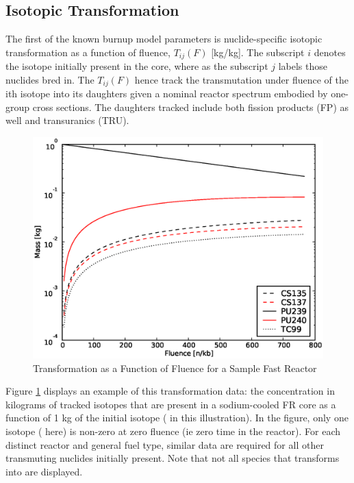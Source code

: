 \subsection{Isotopic Transformation}
\label{1g_sec:iso_transform}
The first of the known burnup model parameters is nuclide-specific isotopic transformation as a 
function of fluence, $T_{ij}(F)$ [kg/kg].  The subscript $i$ denotes 
the isotope initially present in the core, where as the subscript $j$ labels those nuclides bred in.  
The $T_{ij}(F)$ hence track the transmutation under fluence of the ith isotope into its daughters 
given a nominal reactor spectrum embodied by one-group cross sections.  The daughters tracked 
include both fission products (FP) as well and transuranics (TRU).
\begin{figure}[htbp]
\caption{ Transformation as a Function of Fluence for a Sample Fast Reactor}
\label{1g_fig01}
\begin{center}
\includegraphics[scale=0.5]{one_group_method/figs/Fig01.eps}
\end{center}
\end{figure}
Figure \ref{1g_fig01} displays an example of this transformation data: the concentration in 
kilograms of tracked isotopes that are present in a sodium-cooled FR core as a function of 1 kg 
of the initial isotope ( in this illustration).  In the figure, only one isotope 
( here) is non-zero at zero fluence (ie zero time in the reactor).  For each 
distinct reactor and general fuel type, similar data are required for all other transmuting 
nuclides initially present.   Note that not all species that  transforms into are displayed. 

